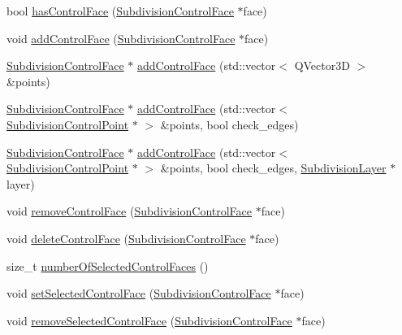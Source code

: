 \begin{DoxyCompactItemize}
\item 
bool \hyperlink{classShipCAD_1_1SubdivisionSurface_ad6e00013faf6c373bfc1421adb941ba4}{has\-Control\-Face} (\hyperlink{classShipCAD_1_1SubdivisionControlFace}{Subdivision\-Control\-Face} $\ast$face)
\item 
void \hyperlink{classShipCAD_1_1SubdivisionSurface_abbbb7422a86771451034d2fb7a76bb26}{add\-Control\-Face} (\hyperlink{classShipCAD_1_1SubdivisionControlFace}{Subdivision\-Control\-Face} $\ast$face)
\item 
\hyperlink{classShipCAD_1_1SubdivisionControlFace}{Subdivision\-Control\-Face} $\ast$ \hyperlink{classShipCAD_1_1SubdivisionSurface_a7c83a514f43b868b5fa286f3bc05a41e}{add\-Control\-Face} (std\-::vector$<$ Q\-Vector3\-D $>$ \&points)
\item 
\hyperlink{classShipCAD_1_1SubdivisionControlFace}{Subdivision\-Control\-Face} $\ast$ \hyperlink{classShipCAD_1_1SubdivisionSurface_a957b534788873921249cd1cc058b9d7e}{add\-Control\-Face} (std\-::vector$<$ \hyperlink{classShipCAD_1_1SubdivisionControlPoint}{Subdivision\-Control\-Point} $\ast$ $>$ \&points, bool check\-\_\-edges)
\item 
\hyperlink{classShipCAD_1_1SubdivisionControlFace}{Subdivision\-Control\-Face} $\ast$ \hyperlink{classShipCAD_1_1SubdivisionSurface_a07d8ca69ed3d45f6e54407fcca8264b2}{add\-Control\-Face} (std\-::vector$<$ \hyperlink{classShipCAD_1_1SubdivisionControlPoint}{Subdivision\-Control\-Point} $\ast$ $>$ \&points, bool check\-\_\-edges, \hyperlink{classShipCAD_1_1SubdivisionLayer}{Subdivision\-Layer} $\ast$layer)
\item 
void \hyperlink{classShipCAD_1_1SubdivisionSurface_a9cce3014753c0b74517b1747a80f6c2c}{remove\-Control\-Face} (\hyperlink{classShipCAD_1_1SubdivisionControlFace}{Subdivision\-Control\-Face} $\ast$face)
\item 
void \hyperlink{classShipCAD_1_1SubdivisionSurface_a394c490440fb20c37abfc2f38d6e50fd}{delete\-Control\-Face} (\hyperlink{classShipCAD_1_1SubdivisionControlFace}{Subdivision\-Control\-Face} $\ast$face)
\item 
size\-\_\-t \hyperlink{classShipCAD_1_1SubdivisionSurface_a084a7f6b226f8d5991f7c99607d0ddb0}{number\-Of\-Selected\-Control\-Faces} ()
\item 
void \hyperlink{classShipCAD_1_1SubdivisionSurface_ab21694a435e0c0dd6139de28ae543254}{set\-Selected\-Control\-Face} (\hyperlink{classShipCAD_1_1SubdivisionControlFace}{Subdivision\-Control\-Face} $\ast$face)
\item 
void \hyperlink{classShipCAD_1_1SubdivisionSurface_aef09d950b0970bd825a984effeee6224}{remove\-Selected\-Control\-Face} (\hyperlink{classShipCAD_1_1SubdivisionControlFace}{Subdivision\-Control\-Face} $\ast$face)

\end{DoxyCompactItemize}
